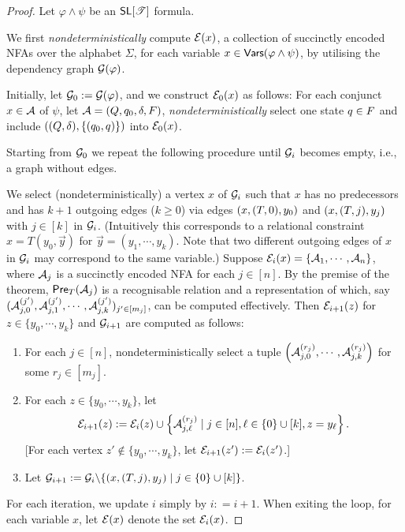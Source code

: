 \begin{proof}
Let $\varphi \wedge \psi$ be an $\textsf{SL}[\mathscr{T}]$ formula. 

We first \emph{nondeterministically} compute $\mathcal{E}(x)$, a collection of succinctly encoded NFAs over the alphabet $\Sigma$, for each variable $x \in \mathsf{Vars}(\varphi \wedge \psi)$, by utilising the dependency graph $\mathcal{G}(\varphi)$. 

Initially, let $\mathcal{G}_0 := \mathcal{G}(\varphi)$, and  
we construct $\mathcal{E}_0(x)$ as follows: For each conjunct $x \in \mathcal{A}$ of $\psi$, let $\mathcal{A} = (Q, q_0, \delta, F)$, \emph{nondeterministically} select one state $q \in F$ and include $((Q, \delta), \{(q_0, q)\})$ into $\mathcal{E}_0(x)$.
  

Starting from $\mathcal{G}_0$ we repeat the following procedure until %
$\mathcal{G}_i$ becomes empty, i.e., a graph without edges.
 
We select (nondeterministically) a vertex $x$ of $\mathcal{G}_i$ such that $x$ has no predecessors and has $k+1$ outgoing edges ($k\geq 0$) via edges $(x, (T, 0), y_0)$ and $(x, (T, j), y_j)$ with $j \in [k]$ in $\mathcal{G}_i$. 
(Intuitively this corresponds to a relational constraint $x=T(y_0, \vec{y})$ for $\vec{y}=(y_1, \cdots, y_k)$.
Note that two different outgoing edges of $x$ in $\mathcal{G}_i$ may correspond to the same variable.)
Suppose $\mathcal{E}_i(x)=\{\mathcal{A}_1, \cdots, \mathcal{A}_n\}$, 
where $\mathcal{A}_j$ is a succinctly encoded NFA for each $j \in [n]$.
By the premise of the theorem, $\textsf{Pre}_{T}(\mathcal{A}_j)$ is a recognisable relation and a representation of which, say $(\mathcal{A}^{(j')}_{j, 0}, \mathcal{A}^{(j')}_{j, 1}, \cdots, \mathcal{A}^{(j')}_{j, k})_{ j'  \in [m_j]}$, can be computed effectively.
Then $\mathcal{E}_{i+1}(z)$ for $z \in  \{y_0,\cdots, y_k\}$ and $\mathcal{G}_{i+1}$ are computed as follows:
\begin{enumerate}
\item For each $j \in [n]$, nondeterministically select a tuple $\left(\mathcal{A}^{(r_j)}_{j, 0}, \cdots, \mathcal{A}^{(r_j)}_{j, k}\right)$ for some $r_j \in [m_j]$.
%
\item For each $z \in \{y_0,\cdots, y_k\}$, let
\[
    \mathcal{E}_{i+1}(z):= \mathcal{E}_{i}(z) \cup \left\{\mathcal{A}^{(r_j)}_{j, \ell} \mid  j \in [n], \ell \in \{0\} \cup [k], z = y_{\ell} \right\}.
\]
[For each vertex $z'  {\notin} \{y_0,\cdots, y_k\}$, let $\mathcal{E}_{i+1}(z') := \mathcal{E}_i(z')$.]
%
\item Let $\mathcal{G}_{i+1}:= \mathcal{G}_i \backslash \{(x, (T, j), y_j) \mid j \in \{0\} \cup [k]\}$.
\end{enumerate}
For each iteration, we update $i$ simply by  $i: = i+1$.
%
When exiting the loop, for each variable $x$, let $\mathcal{E}(x)$ denote the set $\mathcal{E}_i(x)$.


\end{proof}
